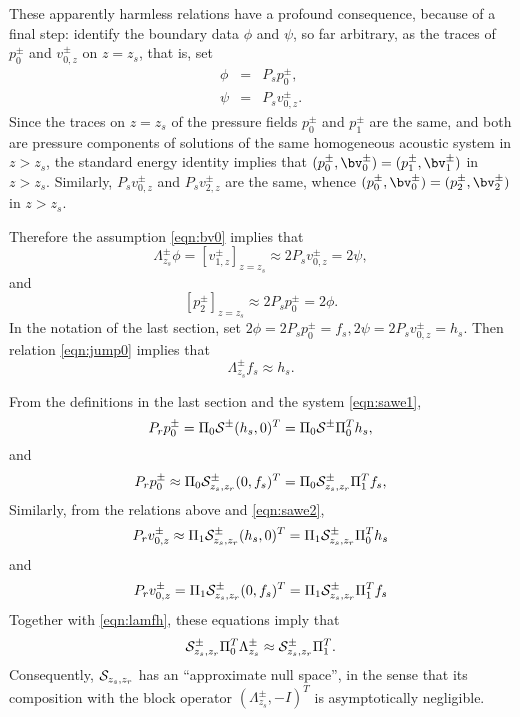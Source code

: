 These apparently harmless relations have a profound consequence,
because of a final step: identify the boundary data $\phi$ and $\psi$,
so far arbitrary, as the traces of $p^{\pm}_0$ and $v^{\pm}_{0,z}$ on $z=z_s$,
that is, set
\begin{eqnarray}
  \phi & = & P_s p^{\pm}_0, \nonumber \\
  \psi & = & P_s v^{\pm}_{0,z}.
             \label{eqn:bv0}
\end{eqnarray}
Since the traces on $z=z_s$ of the pressure fields $p^{\pm}_0$ and $p^{\pm}_1$ are
the same, and both are pressure components of solutions of the same homogeneous
acoustic system in $z>z_s$, the standard energy identity implies that
$(p^{\pm}_0,\bv^{\pm}_0) = (p^{\pm}_1,\bv^{\pm}_1)$ in
$z > z_s$. Similarly, $P_sv^{\pm}_{0,z}$ and $P_sv^{\pm}_{2,z}$ are
the same, whence $(p^{\pm}_0,\bv^{\pm}_0) = (p^{\pm}_2,\bv^{\pm}_2)$ in
$z>z_s$.

Therefore the assumption \ref{eqn:bv0} implies that
\begin{equation}
  \label{eqn:jump0}
  \Lambda^{\pm}_{z_s}\phi = [v^{\pm}_{1,z}]_{z=z_s} \approx 2P_s v^{\pm}_{0,z}  = 2\psi,
\end{equation}
and
\begin{equation}
  \label{eqn:jump1}
[p_2^{\pm}]_{z=z_s} \approx  2P_s p^{\pm}_{0}= 2 \phi.           
\end{equation}
In the notation of the last section, set $2 \phi = 2P_sp^{\pm}_0= f_s,
2\psi = 2P_s v^{\pm}_{0,z}= h_s$. Then relation \ref{eqn:jump0}
implies that
\begin{equation}
  \label{eqn:lamfh}
  \Lambda^{\pm}_{z_s}f_s \approx h_s.
\end{equation}

From the definitions in the last section and the system \ref{eqn:sawe1},
\begin{equation}
  \label{eqn:pident0}
P_r p^{\pm}_0 = \Pi_0{\cal S}^{\pm}(h_s,0)^T = \Pi_0{\cal
  S}^{\pm}\Pi_0^Th_s,
\end{equation}
and
\begin{equation}
  \label{eqn:pident1}
P_r p^{\pm}_0 \approx \Pi_0{\cal S}^{\pm}_{z_s,z_r} (0,f_s)^T = \Pi_0{\cal
  S}^{\pm}_{z_s,z_r} \Pi_1^Tf_s,
\end{equation}
Similarly, from the relations above and \ref{eqn:sawe2},
\begin{equation}
  \label{eqn:vident0}
  P_r  v^{\pm}_{0,z}  \approx \Pi_1{\cal S}^{\pm}_{z_s,z_r}(h_s,0)^T  =
  \Pi_1{\cal S}^{\pm}_{z_s,z_r} \Pi_0^Th_s 
\end{equation}
and
\begin{equation}
  \label{eqn:vident1}
  P_r  v^{\pm}_{0,z}  = \Pi_1{\cal S}^{\pm}_{z_s,z_r}(0,f_s)^T  =
  \Pi_1{\cal S}^{\pm}_{z_s,z_r} \Pi_1^Tf_s 
\end{equation}
Together with \ref{eqn:lamfh}, these equations imply that
\begin{equation}
  \label{eqn:lamnull}
{\cal  S}_{z_s,z_r}^{\pm}\Pi_0^T\Lambda^{\pm}_{z_s} \approx {\cal S}^{\pm}_{z_s,z_r}\Pi_1^T.
\end{equation}
Consequently, ${\cal S}_{z_s,z_r}$ has an ``approximate null space'',
in the sense that its composition with the block operator
$(\Lambda^{\pm}_{z_s},-I)^T$ is asymptotically negligible.

